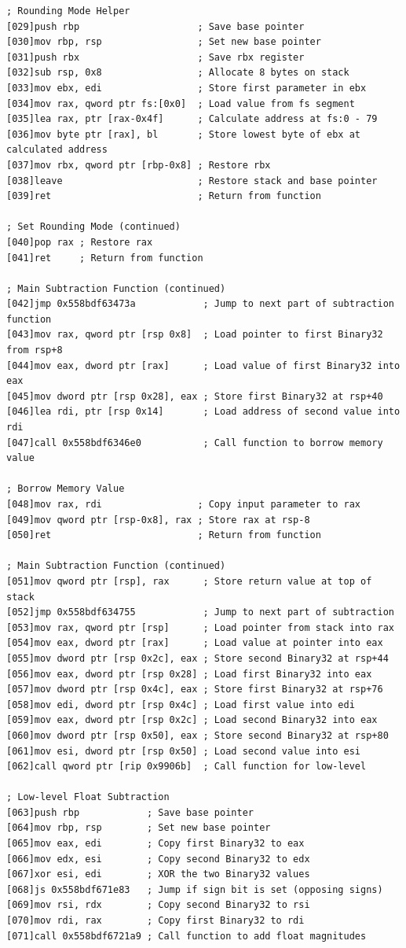\documentclass[12pt,letter]{article}
\begin{document}
\begin{lstlisting}[style=rust, caption={Annotated Binary32 Normal Case Subtraction Instruction Trace}, label={fig:ieee_subtract}]
; Rounding Mode Helper
[029]push rbp                     ; Save base pointer
[030]mov rbp, rsp                 ; Set new base pointer
[031]push rbx                     ; Save rbx register
[032]sub rsp, 0x8                 ; Allocate 8 bytes on stack
[033]mov ebx, edi                 ; Store first parameter in ebx
[034]mov rax, qword ptr fs:[0x0]  ; Load value from fs segment
[035]lea rax, ptr [rax-0x4f]      ; Calculate address at fs:0 - 79
[036]mov byte ptr [rax], bl       ; Store lowest byte of ebx at calculated address
[037]mov rbx, qword ptr [rbp-0x8] ; Restore rbx
[038]leave                        ; Restore stack and base pointer
[039]ret                          ; Return from function

; Set Rounding Mode (continued)
[040]pop rax ; Restore rax
[041]ret     ; Return from function

; Main Subtraction Function (continued)
[042]jmp 0x558bdf63473a            ; Jump to next part of subtraction function
[043]mov rax, qword ptr [rsp 0x8]  ; Load pointer to first Binary32 from rsp+8
[044]mov eax, dword ptr [rax]      ; Load value of first Binary32 into eax
[045]mov dword ptr [rsp 0x28], eax ; Store first Binary32 at rsp+40
[046]lea rdi, ptr [rsp 0x14]       ; Load address of second value into rdi
[047]call 0x558bdf6346e0           ; Call function to borrow memory value

; Borrow Memory Value
[048]mov rax, rdi                 ; Copy input parameter to rax
[049]mov qword ptr [rsp-0x8], rax ; Store rax at rsp-8
[050]ret                          ; Return from function

; Main Subtraction Function (continued)
[051]mov qword ptr [rsp], rax      ; Store return value at top of stack
[052]jmp 0x558bdf634755            ; Jump to next part of subtraction
[053]mov rax, qword ptr [rsp]      ; Load pointer from stack into rax
[054]mov eax, dword ptr [rax]      ; Load value at pointer into eax
[055]mov dword ptr [rsp 0x2c], eax ; Store second Binary32 at rsp+44
[056]mov eax, dword ptr [rsp 0x28] ; Load first Binary32 into eax
[057]mov dword ptr [rsp 0x4c], eax ; Store first Binary32 at rsp+76
[058]mov edi, dword ptr [rsp 0x4c] ; Load first value into edi
[059]mov eax, dword ptr [rsp 0x2c] ; Load second Binary32 into eax
[060]mov dword ptr [rsp 0x50], eax ; Store second Binary32 at rsp+80
[061]mov esi, dword ptr [rsp 0x50] ; Load second value into esi
[062]call qword ptr [rip 0x9906b]  ; Call function for low-level

; Low-level Float Subtraction
[063]push rbp            ; Save base pointer
[064]mov rbp, rsp        ; Set new base pointer
[065]mov eax, edi        ; Copy first Binary32 to eax
[066]mov edx, esi        ; Copy second Binary32 to edx
[067]xor esi, edi        ; XOR the two Binary32 values
[068]js 0x558bdf671e83   ; Jump if sign bit is set (opposing signs)
[069]mov rsi, rdx        ; Copy second Binary32 to rsi
[070]mov rdi, rax        ; Copy first Binary32 to rdi
[071]call 0x558bdf6721a9 ; Call function to add float magnitudes


\end{lstlisting}
\end{document}
